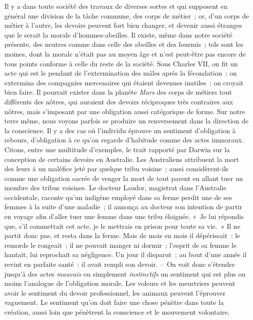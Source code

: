 \documentclass[french,twoside]{book} %
\begin{document}
Il y a dans toute société des travaux de diverses sortes et qui supposent en général une division de la tâche commune, des corps de métier ; or, d’un corps de métier à l’autre, les devoirs peuvent fort bien changer, et devenir aussi étranges que le serait la morale d’hommes-abeilles. Il existe, même dans notre société présente, des neutres comme dans celle des abeilles et des fourmis ; tels sont les moines, dont la morale n’était pas au moyen âge et n’est peut-être pas encore de tous points conforme à celle du reste de la société. Sous Charles VII, on fit un acte qui est le pendant de l’extermination des mâles après la fécondation : on extermina des compagnies mercenaires qui étaient devenues inutiles ; on croyait bien faire. Il pourrait exister dans la planète \emph{Mars} des corps de métiers tout différents des nôtres, qui auraient des devoirs réciproques très contraires aux nôtres, mais s’imposant par une obligation aussi catégorique de forme. Sur notre terre même, nous voyons parfois se produire un renversement dans la direction de la conscience. Il y a des cas où l’individu éprouve un sentiment d’obligation à rebours, d’obligation à ce qu’on regarde d’habitude comme des actes immoraux. Citons, entre une multitude d’exemples, le trait rapporté par Darwin sur la conception de certains devoirs en Australie. Les Australiens attribuent la mort des leurs à un maléfice jeté par quelque tribu voisine ; aussi considèrent-ils comme une obligation sacrée de venger la mort de tout parent en allant tuer un membre des tribus voisines. Le docteur Laudor, magistrat dans l’Australie occidentale, raconte qu’un indigène employé dans sa ferme perdit une de ses femmes à la suite d’une maladie ; il annonça au docteur son intention de partir en voyage afin d’aller tuer une femme dans une tribu éloignée. « Je lui répondis que, s’il commettait cet acte, je le mettrais en prison pour toute sa vie. » Il ne partit donc pas, et resta dans la ferme. Mais de mois en mois il dépérissait : le remords le rongeait ; il ne pouvait manger ni dormir ; l’esprit de sa femme le hantait, lui reprochait sa négligence. Un jour il disparut ; au bout d’une année il revint en parfaite santé : il avait rempli son devoir. – On voit donc s’étendre jusqu’à des actes \emph{mauvais} ou simplement \emph{instinctifs} un sentiment qui est plus ou moins l’analogue de l’obligation morale. Les voleurs et les meurtriers peuvent avoir le sentiment du devoir professionnel, les animaux peuvent l’éprouver vaguement. Le sentiment qu’on doit faire une chose pénètre dans toute la création, aussi loin que pénètrent la conscience et le mouvement volontaire.\par
\end{document}
